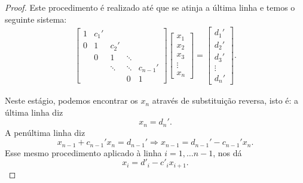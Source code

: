 \begin{proof}
Este procedimento é realizado até que se atinja a última linha e temos o seguinte sistema:
\begin{eqnarray} \begin{bmatrix}
   {1} & {c_1'} & {   } & {   } & {   } \\
   {0} & {1} & {c_2'} & {   } & {   } \\
   {   } & { 0 } & {1} & \ddots & {   } \\
   {   } & {   } & \ddots & \ddots & {c_{n-1}'}\\
   {   } & {   } & {   } & { 0 } & { 1 }
\end{bmatrix}
\begin{bmatrix}
   {x_1 }  \\
   {x_2 }  \\
   {x_3 }  \\
   \vdots   \\
   {x_n }
\end{bmatrix}
=
\begin{bmatrix}
   {d_1' }  \\
   {d_2' }  \\
   {d_3'}  \\
   \vdots   \\
   {d_n' }
\end{bmatrix}.
\end{eqnarray}

Neste estágio, podemos encontrar os $x_n$ através de substituição reversa, isto é: a última linha diz \begin{equation} x_n=d_n'. \end{equation}
A penúltima linha diz \begin{equation} x_{n-1}+c_{n-1}'x_n=d_{n-1}' \Longrightarrow x_{n-1}=d_{n-1}'-c_{n-1}'x_{n}. \end{equation}
Esse mesmo procedimento aplicado à linha $i=1,\ldots n-1$, nos dá \begin{equation} x_i = d'_i - c'_i x_{i + 1}.  \end{equation}
\end{proof}

